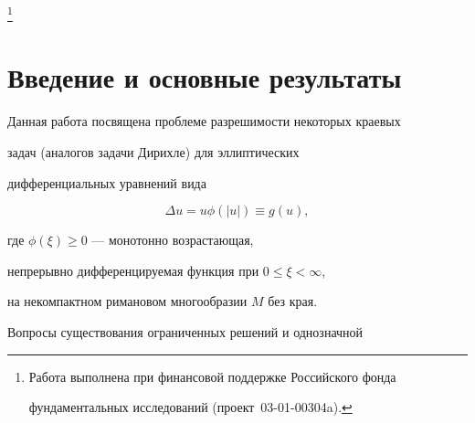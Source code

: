 \thanks{Работа выполнена при финансовой поддержке Российского фонда


фундаментальных исследований (проект \No\,03-01-00304a).}





\date{}




\pagestyle{plain} %







\maketitle


\label{begin}











\section{Введение и основные результаты}


\label{sect1}








Данная работа посвящена проблеме разрешимости некоторых краевых


задач (аналогов задачи Дирихле) для эллиптических


дифференциальных уравнений вида


\begin{equation}


\Delta u=u\phi(|u|)\equiv g(u),


\label{s1.2}


\end{equation}


где $\phi(\xi)\geq0$ --- монотонно возрастающая,


непрерывно дифференцируемая функция при $0{\leq}\xi{<}\infty$,   %


на некомпактном римановом многообразии $M$ без края. 





Вопросы существования ограниченных решений и однозначной



